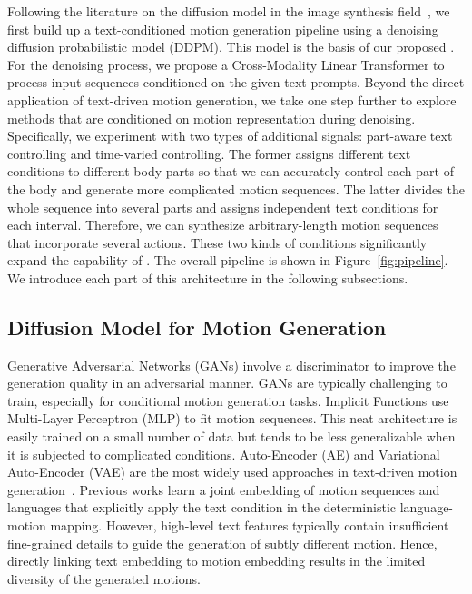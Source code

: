 Following the literature on the diffusion model in the image synthesis field~\citep{ho2020denoising}, we first build up a text-conditioned motion generation pipeline using a denoising diffusion probabilistic model (DDPM). This model is the basis of our proposed \name. For the denoising process, we propose a Cross-Modality Linear Transformer to process input sequences conditioned on the given text prompts. Beyond the direct application of text-driven motion generation, we take one step further to explore methods that are conditioned on motion representation during denoising. Specifically, we experiment with two types of additional signals: part-aware text controlling and time-varied controlling. The former assigns different text conditions to different body parts so that we can accurately control each part of the body and generate more complicated motion sequences. The latter divides the whole sequence into several parts and assigns independent text conditions for each interval. Therefore, we can synthesize arbitrary-length motion sequences that incorporate several actions. These two kinds of conditions significantly expand the capability of \name. The overall pipeline is shown in Figure~\ref{fig:pipeline}. We introduce each part of this architecture in the following subsections.

\subsection{Diffusion Model for Motion Generation}\label{sec3_3}

Generative Adversarial Networks (GANs) involve a discriminator to improve the generation quality in an adversarial manner. GANs are typically challenging to train, especially for conditional motion generation tasks. Implicit Functions use Multi-Layer Perceptron (MLP) to fit motion sequences. This neat architecture is easily trained on a small number of data but tends to be less generalizable when it is subjected to complicated conditions. Auto-Encoder (AE) and Variational Auto-Encoder (VAE) are the most widely used approaches in text-driven motion generation~\citep{ghosh2021synthesis,petrovich2022temos}. Previous works learn a joint embedding of motion sequences and languages that explicitly apply the text condition in the deterministic language-motion mapping. However, high-level text features typically contain insufficient fine-grained details to guide the generation of subtly different motion. Hence, directly linking text embedding to motion embedding results in the limited diversity of the generated motions.

